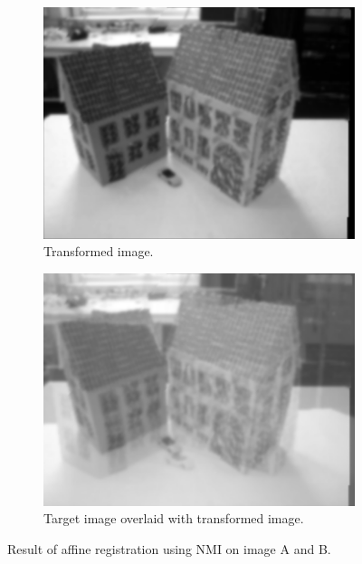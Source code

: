 \begin{figure}[h]
	\centering
	\begin{subfigure}{0.4\linewidth}
		\centering
		\includegraphics[width=\linewidth]{Materials/affineNMIAB}
		\caption{Transformed image.\newline}
	\end{subfigure}
	\hspace{1cm}
	\begin{subfigure}{0.4\linewidth}
		\centering
		\includegraphics[width=\linewidth]{Materials/affineNMIABO}
		\caption{Target image overlaid with transformed image.}
	\end{subfigure}
	\caption{Result of affine registration using NMI on image A and B.}
	\label{affineNMIAB}
\end{figure}
